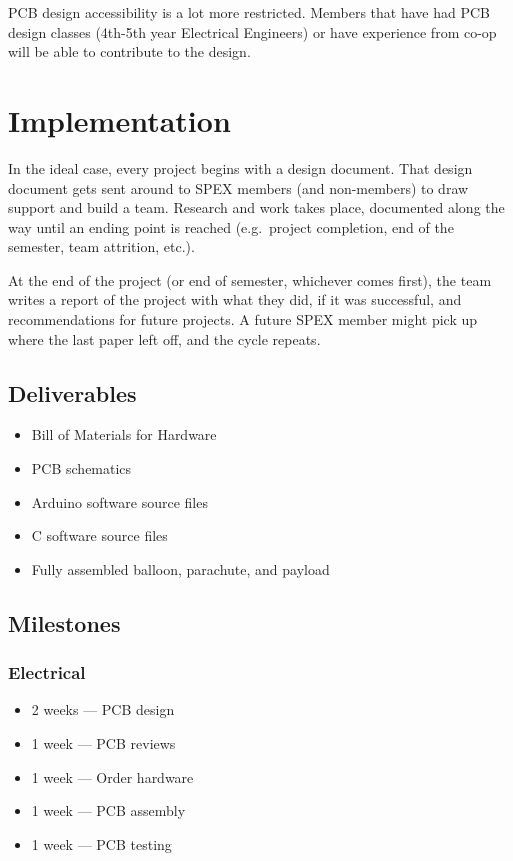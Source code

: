 \documentclass[conference]{IEEEtran} %
\begin{document}
PCB design accessibility is a lot more restricted. Members that have had PCB
design classes (4th-5th year Electrical Engineers) or have experience from co-op
will be able to contribute to the design.



\section{Implementation}
\label{sec:implementation}

In the ideal case, every project begins with a design document.
That design document gets sent around to SPEX members (and non-members) to draw support and build a team.
Research and work takes place, documented along the way until  an ending point is reached (e.g.\ project completion, end of the semester, team attrition, etc.).

At the end of the project (or end of semester, whichever comes first), the team writes a report of the project with what they did, if it was successful, and recommendations for future projects.
A future SPEX member might pick up where the last paper left off, and the cycle repeats.

\subsection{Deliverables}
\label{subsec:deliverables}
\begin{itemize}
    \item Bill of Materials for Hardware
    \item PCB schematics
    \item Arduino software source files
    \item C software source files
    \item Fully assembled balloon, parachute, and payload
\end{itemize}

\subsection{Milestones}
\label{subsec:milestones}
\subsubsection*{Electrical}
\begin{itemize}
    \item 2 weeks --- PCB design
    \item 1 week --- PCB reviews
    \item 1 week --- Order hardware
    \item 1 week --- PCB assembly
    \item 1 week --- PCB testing
\end{itemize}
\end{document}
